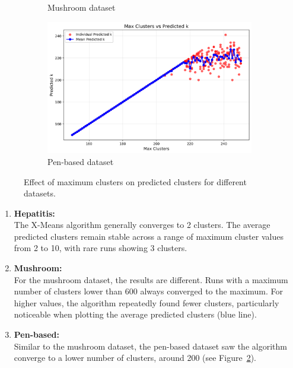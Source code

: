 \begin{figure}[H]
\begin{subfigure}[b]{0.32\textwidth}
		\caption{Mushroom dataset}
		\label{fig:mushroom_max_k}
	\end{subfigure}
	\begin{subfigure}[b]{0.32\textwidth}
		\centering
		\includegraphics[width=\linewidth]{figures/XMeans/pen-based_max_k_vs_predicted_k.png}
		\caption{Pen-based dataset}
		\label{fig:pen_based_max_k}
	\end{subfigure}
	\caption{Effect of maximum clusters on predicted clusters for different datasets.}
	\label{fig:xmeans_max_clusters}
\end{figure}

\begin{enumerate}
	\item \textbf{Hepatitis:}
	\\ The X-Means algorithm generally converges to 2 clusters. The average predicted clusters remain stable across a range of maximum cluster values from 2 to 10, with rare runs showing 3 clusters.
	
	\item \textbf{Mushroom:}
	\\ For the mushroom dataset, the results are different. Runs with a maximum number of clusters lower than 600 always converged to the maximum. For higher values, the algorithm repeatedly found fewer clusters, particularly noticeable when plotting the average predicted clusters (blue line).
	
	\item \textbf{Pen-based:}
	\\ Similar to the mushroom dataset, the pen-based dataset saw the algorithm converge to a lower number of clusters, around 200 (see Figure~\ref{fig:pen_based_max_k}).
\end{enumerate}

